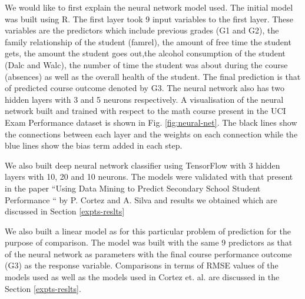 \documentclass[conference]{IEEEtran}
\begin{document}
We would like to first explain the neural network model used. The initial model was built
using R. The first layer took 9 input variables to the first layer. These variables are the
predictors which include previous grades (G1 and G2), the family relationship of the
student (famrel), the amount of free time the student gets, the amount the student goes
out,the alcohol consumption of the student (Dalc and Walc), the number of time the
student was about during the course (absences) as well as the overall health of the
student. The final prediction is that of predicted course outcome denoted by G3.
The neural network also has two hidden layers with 3 and 5 neurons respectively. A
visualisation of the neural network built and trained with respect to the math course
present in the UCI Exam Performance dataset is shown in Fig. \ref{fig:neural-net}.
The black lines show the connections between each layer and the weights on each
connection while the blue lines show the bias term added in each step.

We also built deep neural network classifier using TensorFlow \cite{tensorflow2015-whitepaper} with
3 hidden layers with 10, 20 and 10 neurons. The models were validated with that present
in the paper “Using Data Mining to Predict Secondary School Student Performance “ by
P. Cortez and A. Silva and results we obtained which are discussed in Section \ref{expts-reslts}

We also built a linear model as for this particular problem of prediction for the purpose of comparison. The model was built with the same 9 predictors as that of the neural network as parameters with the final course performance outcome (G3) as the response variable.
Comparisons in terms of RMSE values of the models used as well as the models used
in Cortez et. al.\cite{ref:4} are discussed in the Section \ref{expts-reslts}.
\end{document}
